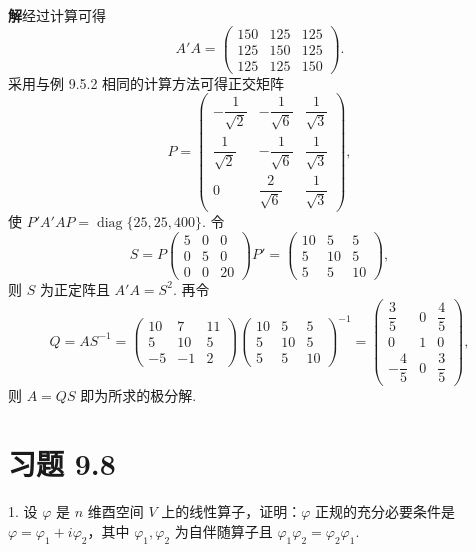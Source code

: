 \documentclass[UTF8,12pt,a4paper,fontset=fandol]{ctexart}
\begin{document}
\noindent\textbf{解}\quad 经过计算可得
\[
  A'A=
  \left(\begin{array}{ccc}
    150 & 125 & 125\\
    125 & 150 & 125\\
    125 & 125 & 150
  \end{array}\right).
\]
采用与例 9.5.2 相同的计算方法可得正交矩阵
\[
  P=
  \left(\begin{array}{ccc}
    -\dfrac1{\sqrt2} & -\dfrac1{\sqrt6} & \dfrac1{\sqrt3}\\
    \dfrac1{\sqrt2} & -\dfrac1{\sqrt6} & \dfrac1{\sqrt3}\\
    0 & \dfrac2{\sqrt6} & \dfrac1{\sqrt3}
  \end{array}\right),
\]
使 $P'A'AP=\operatorname{diag}\{25,25,400\}$. 令
\[
  S=P
  \left(\begin{array}{ccc}
    5 & 0 & 0\\
    0 & 5 & 0\\
    0 & 0 & 20
  \end{array}\right)
  P'
  =
  \left(\begin{array}{ccc}
    10 & 5 & 5\\
    5 & 10 & 5\\
    5 & 5 & 10
  \end{array}\right),
\]
则 $S$ 为正定阵且 $A'A=S^2$. 再令
\[
  Q=AS^{-1}=
  \left(\begin{array}{rrr}
    10 & 7 & 11\\
    5 & 10 & 5\\
    -5 & -1 & 2
  \end{array}\right)
  \left(\begin{array}{ccc}
    10 & 5 & 5\\
    5 & 10 & 5\\
    5 & 5 & 10
  \end{array}\right)^{-1}
  =
  \left(\begin{array}{ccc}
    \dfrac35 & 0 & \dfrac45\\
    0 & 1 & 0\\
    -\dfrac45 & 0 & \dfrac35
  \end{array}\right),
\]
则 $A=QS$ 即为所求的极分解.

\section*{习题 9.8}

1. 设 $\varphi$ 是 $n$ 维酉空间 $V$ 上的线性算子，证明：$\varphi$ 正规的充分必要条件是 $\varphi=\varphi_1+i\varphi_2$，其中 $\varphi_1,\varphi_2$ 为自伴随算子且 $\varphi_1\varphi_2=\varphi_2\varphi_1$.
\end{document}
